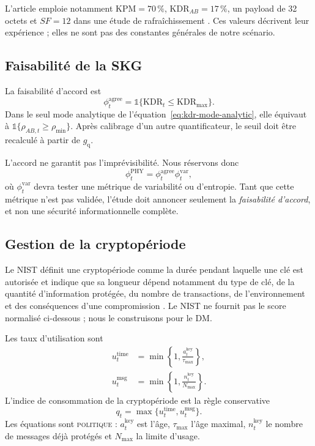 \documentclass[conference,a4paper]{IEEEtran}
\newcommand{\statusPol}{\textsc{politique}}
\newcommand{\KDR}{\mathrm{KDR}}
\begin{document}
L'article emploie notamment $\mathrm{KPM}=70\,\%$, $\KDR_{AB}=17\,\%$, un payload de 32 octets et $SF=12$ dans une étude de rafraîchissement \cite[Sec.~V-C]{ruotsalainen2020}. Ces valeurs décrivent leur expérience ; elles ne sont pas des constantes générales de notre scénario.

\subsection{Faisabilité de la SKG}
La faisabilité d'accord est
\begin{equation}
    \phi_t^{\mathrm{agree}}=\mathbb 1\{\KDR_t\leq\KDR_{\max}\}.
    \label{eq:agreement-feasibility}
\end{equation}
Dans le seul mode analytique de l'équation~\eqref{eq:kdr-mode-analytic}, elle équivaut à $\mathbb 1\{\rho_{AB,t}\geq\rho_{\min}\}$. Après calibrage d'un autre quantificateur, le seuil doit être recalculé à partir de $g_{\mathrm q}$.

L'accord ne garantit pas l'imprévisibilité. Nous réservons donc
\begin{equation}
    \phi_t^{\mathrm{PHY}}=\phi_t^{\mathrm{agree}}\phi_t^{\mathrm{var}},
    \label{eq:phy-feasibility}
\end{equation}
où $\phi_t^{\mathrm{var}}$ devra tester une métrique de variabilité ou d'entropie. Tant que cette métrique n'est pas validée, l'étude doit annoncer seulement la \emph{faisabilité d'accord}, et non une sécurité informationnelle complète.

\subsection{Gestion de la cryptopériode}
Le NIST définit une cryptopériode comme la durée pendant laquelle une clé est autorisée et indique que sa longueur dépend notamment du type de clé, de la quantité d'information protégée, du nombre de transactions, de l'environnement et des conséquences d'une compromission \cite[Sec.~5.3]{nist80057}. Le NIST ne fournit pas le score normalisé ci-dessous ; nous le construisons pour le DM.

Les taux d'utilisation sont
\begin{align}
    u_t^{\mathrm{time}}&=\min\left\{1,\frac{a_t^{\mathrm{key}}}{\tau_{\max}}\right\},\\
    u_t^{\mathrm{msg}}&=\min\left\{1,\frac{n_t^{\mathrm{key}}}{N_{\max}}\right\}.
\end{align}
L'indice de consommation de la cryptopériode est la règle conservative
\begin{equation}
    q_t=\max\{u_t^{\mathrm{time}},u_t^{\mathrm{msg}}\}.
    \label{eq:key-aging}
\end{equation}
Les équations sont \statusPol{} : $a_t^{\mathrm{key}}$ est l'âge, $\tau_{\max}$ l'âge maximal, $n_t^{\mathrm{key}}$ le nombre de messages déjà protégés et $N_{\max}$ la limite d'usage.
\end{document}

